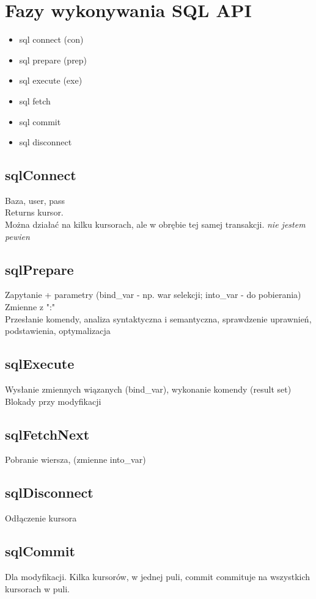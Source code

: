 \documentclass[a4paper,twoside]{article}
\begin{document}
  	\section*{Fazy wykonywania SQL API}
  	\begin{itemize}
  		\item sql connect (con)
  		\item sql prepare (prep)
  		\item sql execute (exe)
  		\item sql fetch
  		\item sql commit
  		\item sql disconnect
  	\end{itemize}
  	
  	\subsection*{sqlConnect} \noindent 
  	Baza, user, pass\\
  	Returns kursor.\\
  	Można działać na kilku kursorach, ale w obrębie tej samej transakcji. \emph{nie jestem pewien}
  	\subsection*{sqlPrepare} \noindent 
  	Zapytanie + parametry (bind\_var - np. war selekcji; into\_var - do pobierania)\\
  	Zmienne z ":"\\
  	Przesłanie komendy, analiza syntaktyczna i semantyczna, sprawdzenie uprawnień, podstawienia, optymalizacja
  	\subsection*{sqlExecute} \noindent 
  	Wysłanie zmiennych wiązanych (bind\_var), wykonanie komendy (result set)\\
  	Blokady przy modyfikacji
  	\subsection*{sqlFetchNext} \noindent 
  	Pobranie wiersza, (zmienne into\_var)
  	\subsection*{sqlDisconnect} \noindent 
  	Odłączenie kursora
  	\subsection*{sqlCommit} \noindent 
  	Dla modyfikacji. Kilka kursorów, w jednej puli, commit commituje na wszystkich kursorach w puli.
\end{document}
